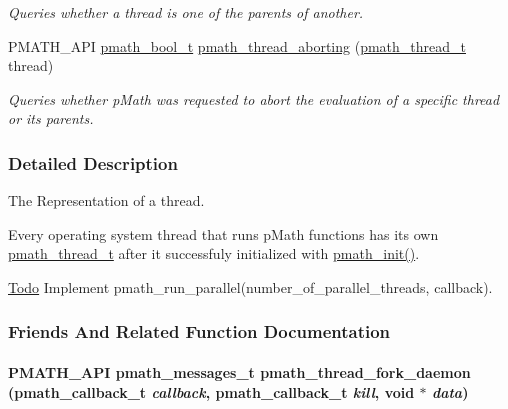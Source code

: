 \begin{CompactItemize}
\begin{CompactList}\small\item\em Queries whether a thread is one of the parents of another. \item\end{CompactList}\item 
PMATH\_\-API \hyperlink{group__general__types_gc92090cb0b56345d6c379ed2341d4ef4}{pmath\_\-bool\_\-t} \hyperlink{group__threads_g3932a5c364197c999dfab0aeb28e8779}{pmath\_\-thread\_\-aborting} (\hyperlink{classpmath__thread__t}{pmath\_\-thread\_\-t} thread)
\begin{CompactList}\small\item\em Queries whether pMath was requested to abort the evaluation of a specific thread or its parents. \item\end{CompactList}\end{CompactItemize}


\subsubsection{Detailed Description}
The Representation of a thread. 

Every operating system thread that runs pMath functions has its own \hyperlink{classpmath__thread__t}{pmath\_\-thread\_\-t} after it successfuly initialized with \hyperlink{group__frontend_gfb9f2c789bee5295c6794d16c0164943}{pmath\_\-init()}. \begin{Desc}
\item[\hyperlink{todo__todo000004}{Todo}]Implement pmath\_\-run\_\-parallel(number\_\-of\_\-parallel\_\-threads, callback). \end{Desc}


\subsubsection{Friends And Related Function Documentation}
\hypertarget{classpmath__thread__t_e6fbf23fd1e7470c0bae379978902830}{
\paragraph[{pmath\_\-thread\_\-fork\_\-daemon}]{\setlength{\rightskip}{0pt plus 5cm}PMATH\_\-API {\bf pmath\_\-messages\_\-t} pmath\_\-thread\_\-fork\_\-daemon ({\bf pmath\_\-callback\_\-t} {\em callback}, \/  {\bf pmath\_\-callback\_\-t} {\em kill}, \/  void $\ast$ {\em data})}\hfill}
\label{classpmath__thread__t_e6fbf23fd1e7470c0bae379978902830}


